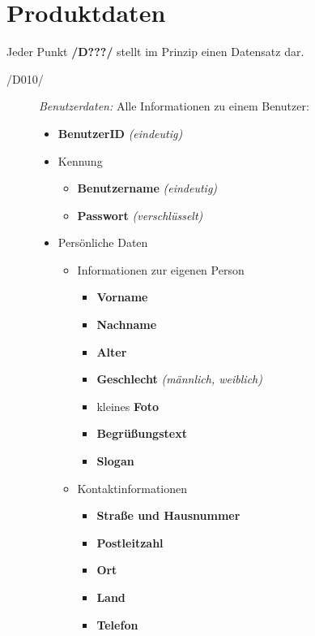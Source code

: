 \section{Produktdaten}


Jeder Punkt \textbf{/D???/} stellt im Prinzip einen Datensatz dar.

\begin{description}
  \item[/D010/]
    \textit{Benutzerdaten:} Alle Informationen zu einem Benutzer:
    \begin{itemize}
      \item \textbf{BenutzerID} \textit{(eindeutig)}
      \item Kennung
        \begin{itemize}
          \item \textbf{Benutzername} \textit{(eindeutig)}
          \item \textbf{Passwort} \textit{(verschlüsselt)}
        \end{itemize}
      \item Persönliche Daten
        \begin{itemize}
          \item Informationen zur eigenen Person
            \begin{itemize}
              \item \textbf{Vorname}
              \item \textbf{Nachname}
              \item \textbf{Alter}
              \item \textbf{Geschlecht} \textit{(männlich, weiblich)}
              \item kleines \textbf{Foto}
              \item \textbf{Begrüßungstext}
              \item \textbf{Slogan}
            \end{itemize}
          \item Kontaktinformationen
            \begin{itemize}
              \item \textbf{Straße und Hausnummer}
              \item \textbf{Postleitzahl}
              \item \textbf{Ort}
              \item \textbf{Land}
              \item \textbf{Telefon}

\end{itemize}
\end{itemize}
\end{itemize}
\end{description}

